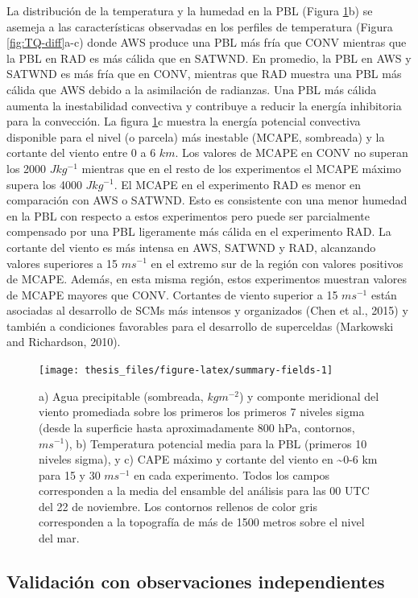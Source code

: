 \documentclass[12pt,oneside,a4paper]{reedthesis}
\begin{document}
La distribución de la temperatura y la humedad en la PBL (Figura \ref{fig:summary-fields}b) se asemeja a las características observadas en los perfiles de temperatura (Figura \ref{fig:TQ-diff}a-c) donde AWS produce una PBL más fría que CONV mientras que la PBL en RAD es más cálida que en SATWND. En promedio, la PBL en AWS y SATWND es más fría que en CONV, mientras que RAD muestra una PBL más cálida que AWS debido a la asimilación de radianzas. Una PBL más cálida aumenta la inestabilidad convectiva y contribuye a reducir la energía inhibitoria para la convección. La figura \ref{fig:summary-fields}c muestra la energía potencial convectiva disponible para el nivel (o parcela) más inestable (MCAPE, sombreada) y la cortante del viento entre 0 a 6 \(km\). Los valores de MCAPE en CONV no superan los 2000 \(Jkg^{-1}\) mientras que en el resto de los experimentos el MCAPE máximo supera los 4000 \(Jkg^{-1}\). El MCAPE en el experimento RAD es menor en comparación con AWS o SATWND. Esto es consistente con una menor humedad en la PBL con respecto a estos experimentos pero puede ser parcialmente compensado por una PBL ligeramente más cálida en el experimento RAD. La cortante del viento es más intensa en AWS, SATWND y RAD, alcanzando valores superiores a 15 \(ms^{-1}\) en el extremo sur de la región con valores positivos de MCAPE. Además, en esta misma región, estos experimentos muestran valores de MCAPE mayores que CONV. Cortantes de viento superior a 15 \(ms^{-1}\) están asociadas al desarrollo de SCMs más intensos y organizados (Chen et al., 2015) y también a condiciones favorables para el desarrollo de superceldas (Markowski and Richardson, 2010).


\begin{figure}
\texttt{[image: thesis\_files/figure-latex/summary-fields-1]} \caption{a) Agua precipitable (sombreada, \(kgm^{-2}\)) y componte meridional del viento promediada sobre los primeros los primeros 7 niveles sigma (desde la superficie hasta aproximadamente 800 hPa, contornos, \(ms^{-1}\)), b) Temperatura potencial media para la PBL (primeros 10 niveles sigma), y c) CAPE máximo y cortante del viento en \textasciitilde0-6 km para 15 y 30 \(ms^{-1}\) en cada experimento. Todos los campos corresponden a la media del ensamble del análisis para las 00 UTC del 22 de noviembre. Los contornos rellenos de color gris corresponden a la topografía de más de 1500 metros sobre el nivel del mar.}\label{fig:summary-fields}
\end{figure}
\hypertarget{val-analisis}{%
\subsection{Validación con observaciones independientes}\label{val-analisis}}
\end{document}
